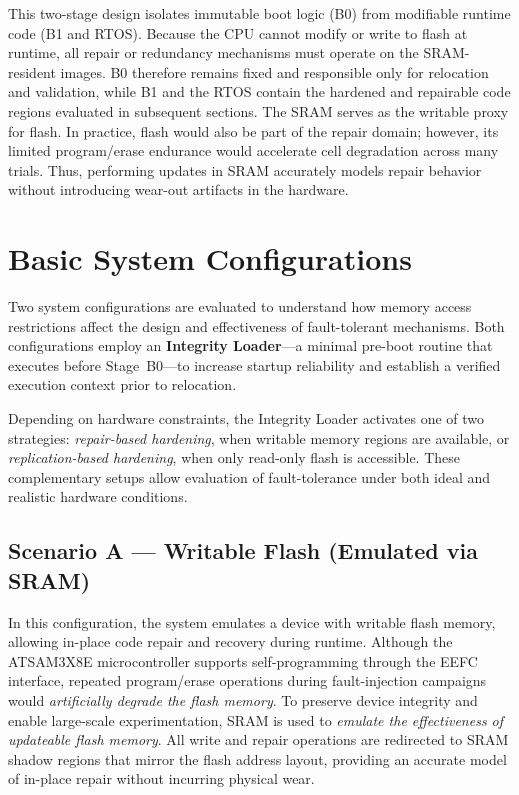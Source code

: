 This two-stage design isolates immutable boot logic (B0) from modifiable
runtime code (B1 and RTOS). Because the CPU cannot modify or write to flash at
runtime, all repair or redundancy mechanisms must operate on the SRAM-resident
images. B0 therefore remains fixed and responsible only for relocation and
validation, while B1 and the RTOS contain the hardened and repairable code
regions evaluated in subsequent sections. The SRAM serves as the writable proxy
for flash. In practice, flash would also be part of the repair domain; however,
its limited program/erase endurance would accelerate cell degradation across
many trials. Thus, performing updates in SRAM accurately models repair behavior
without introducing wear-out artifacts in the hardware.

\section{Basic System Configurations}
\label{sec:basic-configurations}

Two system configurations are evaluated to understand how memory access
restrictions affect the design and effectiveness of fault-tolerant mechanisms.
Both configurations employ an \textbf{Integrity Loader}—a minimal pre-boot
routine that executes before Stage~B0—to increase startup reliability and
establish a verified execution context prior to relocation.

Depending on hardware constraints, the Integrity Loader activates one of two
strategies:
\emph{repair-based hardening}, when writable memory regions are available, or
\emph{replication-based hardening}, when only read-only flash is accessible.
These complementary setups allow evaluation of fault-tolerance under both ideal
and realistic hardware conditions.

\subsection{Scenario A — Writable Flash (Emulated via SRAM)}
\label{sec:scenario-a}

In this configuration, the system emulates a device with writable flash memory,
allowing in-place code repair and recovery during runtime. Although the
ATSAM3X8E microcontroller supports self-programming through the EEFC interface,
repeated program/erase operations during fault-injection campaigns would
\emph{artificially degrade the flash memory}. To preserve device integrity and
enable large-scale experimentation, SRAM is used to \emph{emulate the
effectiveness of updateable flash memory}. All write and repair operations are
redirected to SRAM shadow regions that mirror the flash address layout,
providing an accurate model of in-place repair without incurring physical wear.


